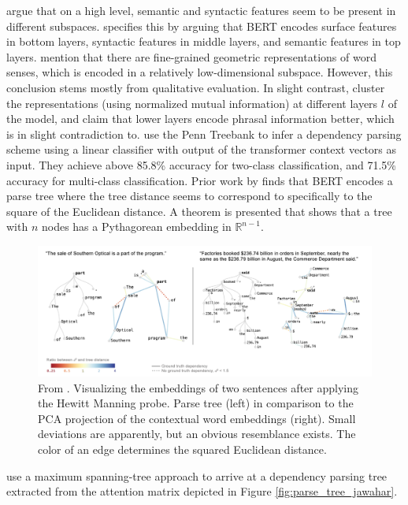 \documentclass[a4paper,12pt,oneside,openright]{report}
\begin{document}
\cite{coenen19} argue that on a high level, semantic and syntactic features seem to be present in different subspaces.
\cite{jawahar19} specifies this by arguing that BERT encodes surface features in bottom layers, syntactic features in middle layers, and semantic features in top layers.
\cite{coenen19} mention that there are fine-grained geometric representations of word senses, which is encoded in a relatively low-dimensional subspace.
However, this conclusion stems mostly from qualitative evaluation.
In slight contrast, \cite{jawahar19} cluster the representations (using normalized mutual information) at different layers $l$ of the model, and claim that lower layers encode phrasal information better, which is in slight contradiction to.
\cite{coenen19} use the Penn Treebank \cite{marcus93} to infer a dependency parsing scheme using a linear classifier with output of the transformer context vectors as input.
They achieve above 85.8\% accuracy for two-class classification, and 71.5\% accuracy for multi-class classification.
Prior work by \cite{hewitt19} finds that BERT encodes a parse tree where the tree distance seems to correspond to specifically to the square of the Euclidean distance.
A theorem is presented that shows that a tree with $n$ nodes has a Pythagorean embedding in $\mathbb{R}^{n-1}$.

\begin{figure}
	\center
  \includegraphics[width=\linewidth]{./assets/relatedwork/BERT_tree.png}
  \caption{From \cite{coenen19}. Visualizing the embeddings of two sentences after applying the Hewitt Manning probe. Parse tree (left) in comparison to the PCA projection of the contextual word embeddings (right). Small deviations are apparently, but an obvious resemblance exists. The color of an edge determines the squared Euclidean distance.}
  \label{fig:BERT_tree}
\end{figure}

\cite{jawahar19}  use a maximum spanning-tree approach to arrive at a dependency parsing tree extracted from the attention matrix depicted in Figure \ref{fig:parse_tree_jawahar}.\\
\end{document}
